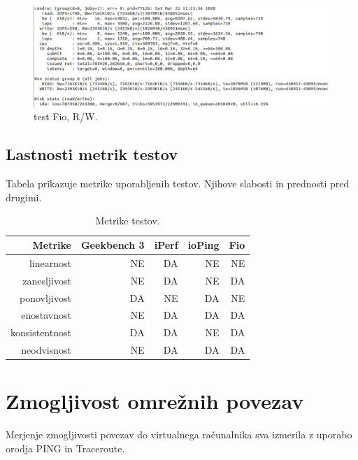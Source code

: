 \begin{figure}[H]
    \centering
    \includegraphics[scale=0.4]{Img/fio1.png}
    \caption{test Fio, R/W.}
    \label{fig:6_fio1}
\end{figure}

\subsection{Lastnosti metrik testov}

Tabela prikazuje metrike uporabljenih testov. Njihove slabosti in prednosti pred drugimi.

\begin{table}[H]
    \centering
        \begin{tabular}{ | r | r | r | r | r |} 
            \hline
            Metrike & Geekbench 3 & iPerf & ioPing & Fio  \\
            \hline
            linearnost & NE & DA & NE & NE \\
            zanesljivost & NE & DA & NE & DA  \\
            ponovljivost & DA & NE & DA & NE  \\
            enostavnost & NE & DA & DA & DA  \\
            konsistentnost & DA & DA & NE & DA  \\
            neodvisnost & NE & DA & DA & DA  \\
            \hline
        \end{tabular}
        \caption{Metrike  testov.}
    \label{table:1_chunks}
\end{table}



\section{Zmogljivost omrežnih povezav}

Merjenje zmogljivosti povezav do virtualnega računalnika sva izmerila z uporabo orodja PING in Traceroute.


